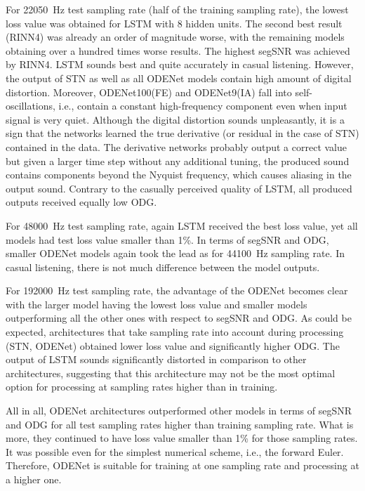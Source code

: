 For \SI{22050}{Hz} test sampling rate (half of the training sampling rate), the lowest loss value was obtained for \ac{LSTM} with 8 hidden units. The second best result (\ac{RINN}4) was already an order of magnitude worse, with the remaining models obtaining over a hundred times worse results. The highest \ac{segSNR} was achieved by \ac{RINN}4. \ac{LSTM} sounds best and quite accurately in casual listening. However, the output of \ac{STN} as well as all ODENet models contain high amount of digital distortion. Moreover, ODENet100(FE) and ODENet9(IA) fall into self-oscillations, i.e., contain a constant high-frequency component even when input signal is very quiet. Although the digital distortion sounds unpleasantly, it is a sign that the networks learned the true derivative (or residual in the case of \ac{STN}) contained in the data. The derivative networks probably output a correct value but given a larger time step without any additional tuning, the produced sound contains components beyond the Nyquist frequency, which causes aliasing in the output sound. Contrary to the casually perceived quality of \ac{LSTM}, all produced outputs received equally low \ac{ODG}. 

For \SI{48000}{Hz} test sampling rate, again \ac{LSTM} received the best loss value, yet all models had test loss value smaller than 1\%. In terms of \ac{segSNR} and \ac{ODG}, smaller ODENet models again took the lead as for \SI{44100}{Hz} sampling rate. In casual listening, there is not much difference between the model outputs.

For \SI{192000}{Hz} test sampling rate, the advantage of the ODENet becomes clear with the larger model having the lowest loss value and smaller models outperforming all the other ones with respect to \ac{segSNR} and \ac{ODG}. As could be expected, architectures that take sampling rate into account during processing (\ac{STN}, ODENet) obtained lower loss value and significantly higher \ac{ODG}. The output of \ac{LSTM} sounds significantly distorted in comparison to other architectures, suggesting that this architecture may not be the most optimal option for processing at sampling rates higher than in training. 

All in all, ODENet architectures outperformed other models in terms of \ac{segSNR} and \ac{ODG} for all test sampling rates higher than training sampling rate. What is more, they continued to have loss value smaller than 1\% for those sampling rates. It was possible even for the simplest numerical scheme, i.e., the forward Euler. Therefore, ODENet is suitable for training at one sampling rate and processing at a higher one.

